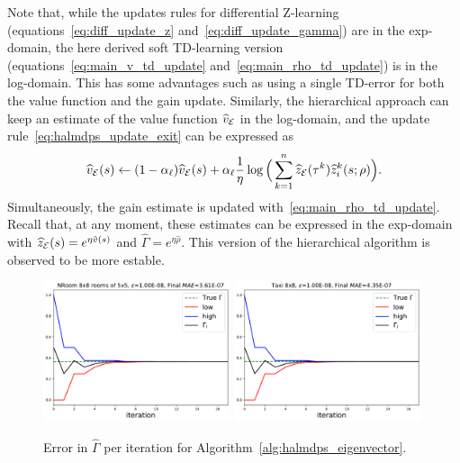 Note that, while the updates rules for differential Z-learning (equations~\eqref{eq:diff_update_z} and~\eqref{eq:diff_update_gamma}) are in the exp-domain, the here derived soft TD-learning version (equations~\eqref{eq:main_v_td_update} and~\eqref{eq:main_rho_td_update}) is in the log-domain. This has some advantages such as using a single TD-error for both the value function and the gain update. Similarly, the hierarchical approach can keep an estimate of the value function $\widehat v_{\mathcal{E}}$ in the log-domain, and the update rule~\eqref{eq:halmdps_update_exit} can be expressed as 
\begin{equation*}
    \widehat v_{\mathcal{E}}(s)\gets (1-\alpha_\ell) \widehat v_{\mathcal{E}}(s) + \alpha_\ell\frac{1}{\eta} \log\Big(\sum_{k=1}^n \widehat z_{\mathcal{E}}(\tau^k) \widehat z_i^k(s;\rho)\Big).
\end{equation*}
Simultaneously, the gain estimate is updated with~\eqref{eq:main_rho_td_update}. Recall that, at any moment, these estimates can be expressed in the exp-domain with $\widehat z_{\mathcal{E}}(s)=e^{\eta\hat v(s)}$ and $\widehat\Gamma=e^{\eta\hat\rho}$. This version of the hierarchical algorithm is observed to be more estable.


\begin{figure}[!ht]
  \centering
  \includegraphics*[width=0.49\textwidth]{figures/chapter2/eigenvectors/lmdp-nroom-3.pdf}
  \includegraphics*[width=0.49\textwidth]{figures/chapter2/eigenvectors/lmdp-taxi-8.pdf}
  \caption{Error in $\widehat\Gamma$ per iteration for Algorithm~\ref{alg:halmdps_eigenvector}.}
  \label{fig:eigenvectos}
 \end{figure}

